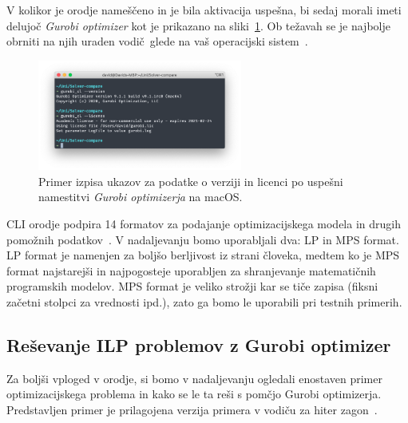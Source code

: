 \documentclass[a4paper,11pt]{article}
\begin{document}
V kolikor je orodje nameščeno in je bila aktivacija uspešna, bi sedaj morali imeti delujoč \textit{Gurobi optimizer} kot je prikazano na sliki~\ref{img:gurobi_license}. Ob težavah se je najbolje obrniti na njih uraden vodič~glede na vaš operacijski sistem~\cite{GurobiQuickstart:2020}.
\begin{figure}[htpb] \centering
	\includegraphics[width=0.6\textwidth]{images/gurobi_license.png}
	\caption{Primer izpisa ukazov za podatke o verziji in licenci po uspešni namestitvi \textit{Gurobi optimizerja} na macOS.}
	\label{img:gurobi_license}
\end{figure}
CLI orodje podpira 14 formatov za podajanje optimizacijskega modela in drugih pomožnih podatkov~\cite{GurobiFormats:2020}. V nadaljevanju bomo uporabljali dva: LP in MPS format. LP format je namenjen za boljšo berljivost iz strani človeka, medtem ko je MPS format najstarejši in najpogosteje uporabljen za shranjevanje matematičnih programskih modelov. MPS format je veliko strožji kar se tiče zapisa (fiksni začetni stolpci za vrednosti ipd.), zato ga bomo le uporabili pri testnih primerih.

\subsection{Reševanje ILP problemov z Gurobi optimizer}

Za boljši vploged v orodje, si bomo v nadaljevanju ogledali enostaven primer optimizacijskega problema in kako se le ta reši s pomčjo Gurobi optimizerja. Predstavljen primer je prilagojena verzija primera v vodiču za hiter zagon~\cite{GurobiQuickstart:2020}. 
\end{document}
